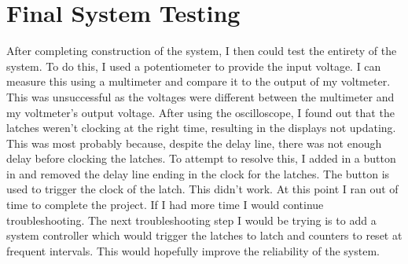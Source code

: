 \chapter{Final System Testing}
\label{ch:testing}
After completing construction of the system, I then could test the entirety of the system.\newline
To do this, I used a potentiometer to provide the input voltage. I can measure this using a multimeter and compare it to the output of my voltmeter.
This was unsuccessful as the voltages were different between the multimeter and my voltmeter's output voltage.\newline
After using the oscilloscope, I found out that the latches weren't clocking at the right time, resulting in the displays not updating. This was most probably because, despite the delay line, there was not enough delay before clocking the latches.  \newline
To attempt to resolve this, I added in a button in and removed the delay line ending in the clock for the latches. The button is used to trigger the clock of the latch. This didn't work. \newline
At this point I ran out of time to complete the project. If I had more time I would continue troubleshooting.
The next troubleshooting step I would be trying is to add a system controller which would trigger the latches to latch and counters to reset at frequent intervals. This would hopefully improve the reliability of the system.